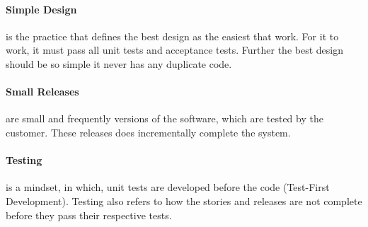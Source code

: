 \paragraph{Simple Design} is the practice that defines the best design as the easiest that work.
For it to work, it must pass all unit tests and acceptance tests.
Further the best design should be so simple it never has any duplicate code.


\paragraph{Small Releases} are small and frequently versions of the software, which are tested by the customer.
These releases does incrementally complete the system.

\paragraph{Testing} is a mindset, in which, unit tests are developed before the code (Test-First Development).
Testing also refers to how the stories and releases are not complete before they pass their respective tests.


